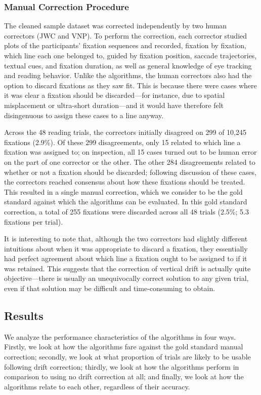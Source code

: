 \documentclass[doc,biblatex]{apa7}
\begin{document}
\subsubsection{Manual Correction Procedure}

The cleaned sample dataset was corrected independently by two human correctors (JWC and VNP). To perform the correction, each corrector studied plots of the participants' fixation sequences and recorded, fixation by fixation, which line each one belonged to, guided by fixation position, saccade trajectories, textual cues, and fixation duration, as well as general knowledge of eye tracking and reading behavior. Unlike the algorithms, the human correctors also had the option to discard fixations as they saw fit. This is because there were cases where it was clear a fixation should be discarded---for instance, due to spatial misplacement or ultra-short duration---and it would have therefore felt disingenuous to assign these cases to a line anyway.

Across the 48 reading trials, the correctors initially disagreed on 299 of 10,245 fixations (2.9\%). Of these 299 disagreements, only 15 related to which line a fixation was assigned to; on inspection, all 15 cases turned out to be human error on the part of one corrector or the other. The other 284 disagreements related to whether or not a fixation should be discarded; following discussion of these cases, the correctors reached consensus about how these fixations should be treated. This resulted in a single manual correction, which we consider to be the gold standard against which the algorithms can be evaluated. In this gold standard correction, a total of 255 fixations were discarded across all 48 trials (2.5\%; 5.3 fixations per trial).

It is interesting to note that, although the two correctors had slightly different intuitions about when it was appropriate to discard a fixation, they essentially had perfect agreement about which line a fixation ought to be assigned to if it was retained. This suggests that the correction of vertical drift is actually quite objective---there is usually an unequivocally correct solution to any given trial, even if that solution may be difficult and time-consuming to obtain.

\subsection{Results}

We analyze the performance characteristics of the algorithms in four ways. Firstly, we look at how the algorithms fare against the gold standard manual correction; secondly, we look at what proportion of trials are likely to be usable following drift correction; thirdly, we look at how the algorithms perform in comparison to using no drift correction at all; and finally, we look at how the algorithms relate to each other, regardless of their accuracy.
\end{document}
